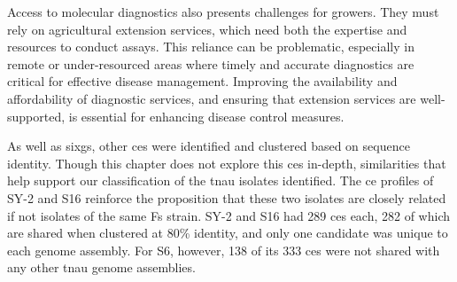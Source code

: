 Access to molecular diagnostics also presents challenges for growers. They must rely on agricultural extension services, which need both the expertise and resources to conduct assays. This reliance can be problematic, especially in remote or under-resourced areas where timely and accurate diagnostics are critical for effective disease management. Improving the availability and affordability of diagnostic services, and ensuring that extension services are well-supported, is essential for enhancing disease control measures.


As well as \acp{sixg}, other \acfp{ce} were identified and clustered based on sequence identity. Though this chapter does not explore this \acp{ce} in-depth, similarities that help support our classification of the \ac{tnau} isolates identified. The \ac{ce} profiles of SY-2 and S16 reinforce the proposition that these two isolates are closely related if not isolates of the same \ac{Fs} strain. SY-2 and S16 had 289 \acp{ce} each, 282 of which are shared when clustered at 80\% identity, and only one candidate was unique to each genome assembly. For S6, however, 138 of its 333 \acp{ce} were not shared with any other \ac{tnau} genome assemblies.

